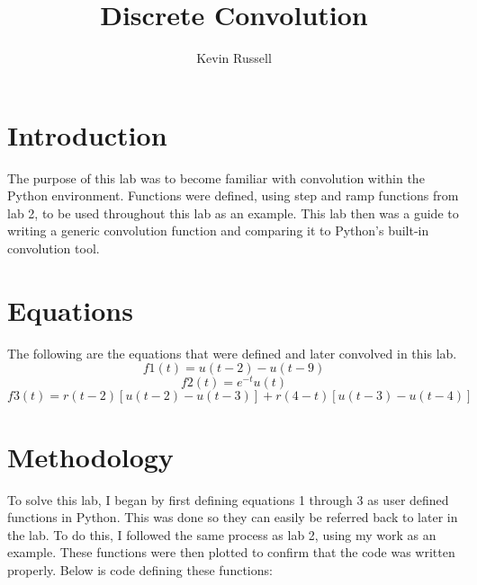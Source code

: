 \documentclass[12pt, titlepage]{article}
\author{Kevin Russell}
\title{Discrete Convolution}
\date{\parbox{\linewidth}{\centering%
  \experimentDate
  \endgraf\bigskip
  \className\ -- Section \sectionNumber\
}}
\begin{document}
 \newpage
	    \maketitle
    
    \newpage
        \tableofcontents
    
    \newpage
        \section{Introduction}
        The purpose of this lab was to become familiar with convolution within the Python environment.  Functions were defined, using step and ramp functions from lab 2, to be used throughout this lab as an example.  This lab then was a guide to writing a generic convolution function and comparing it to Python's built-in convolution tool.
        
        \section{Equations}
        The following are the equations that were defined and later convolved in this lab.
        \begin{equation}
            f1(t) = u(t-2) -u(t-9)
        \end{equation}
        \begin{equation}
            f2(t) = e^{-t}u(t)
        \end{equation}
        \begin{equation}
            f3(t) = r(t-2)[u(t-2) -u(t-3)]+r(4-t)[u(t-3)-u(t-4)]
        \end{equation}
        
        \section{Methodology}
        To solve this lab, I began by first defining equations 1 through 3 as user defined functions in Python.  This was done so they can easily be referred back to later in the lab.  To do this, I followed the same process as lab 2, using my work as an example.  These functions were then plotted to confirm that the code was written properly.  Below is code defining these functions:
        
\end{document}
